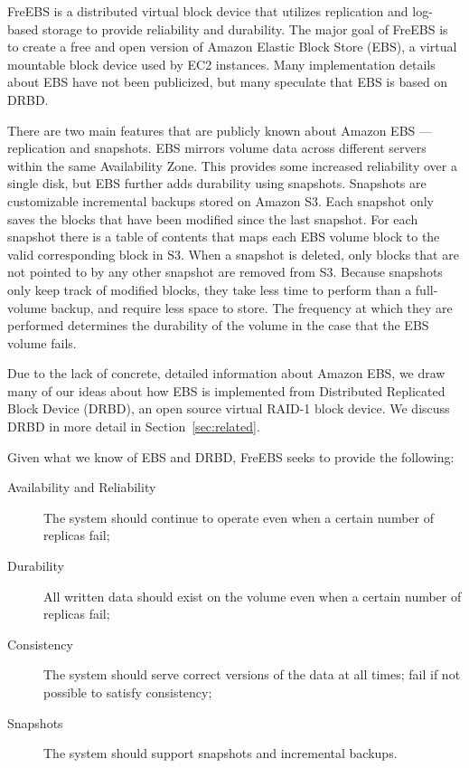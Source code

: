 FreEBS is a distributed virtual block device that utilizes replication and 
log-based storage to provide reliability and durability. The major 
goal of FreEBS is to create a free and open version of Amazon Elastic Block 
Store (EBS)\cite{amazonEBS}, a virtual mountable block device used by EC2 
instances. Many implementation details about EBS have not been publicized,
but many speculate that EBS is based on 
DRBD\textsuperscript{\textregistered}\cite{drbd}. 

There are two main features that are publicly known about Amazon EBS --- 
replication and snapshots. EBS mirrors volume data across different 
servers within the same Availability Zone. This provides some increased 
reliability over a single disk, but EBS further adds durability using 
snapshots. Snapshots are 
customizable incremental backups stored on Amazon S3. Each snapshot only 
saves the blocks that have been modified since the last snapshot. For each
snapshot there is a table of contents that maps each EBS volume block to 
the valid corresponding block in S3. When a snapshot is deleted, only 
blocks that are not pointed to by any other snapshot are removed from S3. 
Because snapshots only keep track of modified blocks, they take less 
time to perform than a full-volume backup, and require less space to store. 
The frequency at which they are performed determines the durability of 
the volume in the case that the EBS volume fails. \cite{amazonEBS} 

Due to the lack of concrete, detailed information about Amazon EBS, we 
draw many of our ideas about how EBS is implemented from Distributed Replicated 
Block Device\textsuperscript{\textregistered} (DRBD)\cite{drbd}, an open source 
virtual RAID-1 block device. We discuss DRBD\textsuperscript{\textregistered}
in more detail in Section~\ref{sec:related}.

Given what we know of EBS and DRBD, FreEBS seeks to provide the following:

\begin{description}
    \item[Availability and Reliability]{The system should continue to operate even when a certain
            number of replicas fail;}
    \item[Durability]{All written data should exist on the volume even when a certain number of replicas fail;}
    \item[Consistency]{The system should serve correct versions of the data at all times; fail if not possible to satisfy consistency;}
    \item[Snapshots]{The system should support snapshots and incremental backups.}
\end{description}

